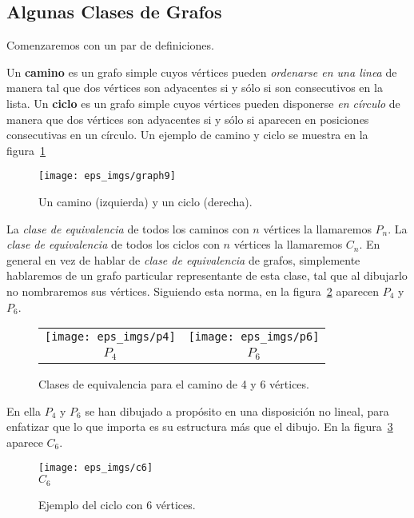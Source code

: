 \subsection{Algunas Clases de Grafos}

Comenzaremos con un par de definiciones.
\begin{definicion}
Un {\bf camino} es un grafo simple cuyos vértices pueden \emph{ordenarse en una linea} de manera tal que dos vértices son adyacentes si y sólo si son consecutivos en la lista.
Un {\bf ciclo} es un grafo simple cuyos vértices pueden disponerse \emph{en círculo} de manera que dos vértices son adyacentes si y sólo si aparecen en posiciones consecutivas en un círculo.
Un ejemplo de camino y ciclo se muestra en la figura~\ref{fig:graph9}
\begin{figure}[h!]
\centering
\texttt{[image: eps\_imgs/graph9]}\\
\caption{Un camino (izquierda) y un ciclo (derecha).}
\label{fig:graph9}
\end{figure}
\end{definicion}

\begin{definicion}
La \emph{clase de equivalencia} de todos los caminos con $n$ vértices la llamaremos $P_n$. 
La \emph{clase de equivalencia} de todos los ciclos con $n$ vértices la llamaremos $C_n$.
En general en vez de hablar de \emph{clase de equivalencia} de grafos, simplemente hablaremos de un grafo particular representante de esta clase, tal que al dibujarlo no nombraremos sus vértices.
Siguiendo esta norma, en la figura~\ref{fig:paths} aparecen $P_4$ y $P_6$.
\begin{figure}[h!]
\centering
\begin{tabular}{cc}
\texttt{[image: eps\_imgs/p4]}\hspace*{3em} &  \texttt{[image: eps\_imgs/p6]} \\
$P_4$\hspace*{3em} & $P_6$
\end{tabular}
\caption{Clases de equivalencia para el camino de 4 y 6 vértices.}
\label{fig:paths}
\end{figure}
En ella $P_4$ y $P_6$ se han dibujado a propósito en una disposición no lineal, para enfatizar que lo que importa es su estructura más que el dibujo.
En la figura~\ref{fig:cycle} aparece $C_6$.
\begin{figure}[h!]
\centering
\texttt{[image: eps\_imgs/c6]}\\
$C_6$
\caption{Ejemplo del ciclo con 6 vértices.}
\label{fig:cycle}
\end{figure}
\end{definicion}

